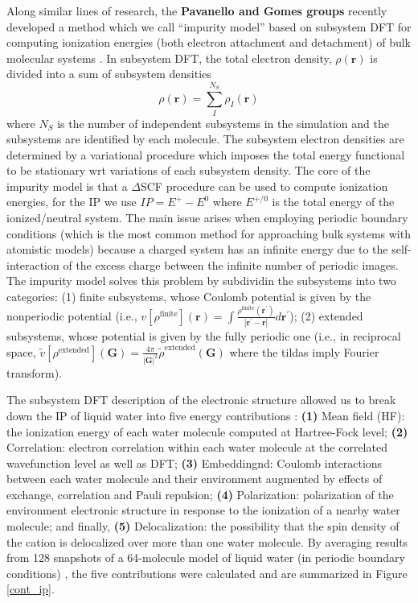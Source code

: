 \documentclass[notitlepage,12pt]{report}
\def\br{{\mathbf{r}}}
\def\bG{{\mathbf{G}}}
\def\brp{{\mathbf{r}^\prime}}
\begin{document}
    Along similar lines of research, the {\bf Pavanello and Gomes groups} recently developed a method which we call ``impurity model'' based on subsystem DFT \supercite{jacob2014subsystem,wesolowski2015frozen,krishtal2015subsystem} for computing ionization energies (both electron attachment and detachment) of bulk molecular systems \supercite{tolle2019charged}. In subsystem DFT,  the total electron density, $\rho(\br)$ is divided into a sum of subsystem densities 
\begin{equation}
    \label{dens}
    \rho(\br) = \sum_I^{N_S}\rho_I(\br)
\end{equation}
    where $N_S$ is the number of independent subsystems in the simulation and the subsystems are identified by each molecule. The subsystem electron densities are determined by a variational procedure which imposes the total energy functional to be stationary wrt variations of each subsystem density. The core of the impurity model is that a $\Delta$SCF procedure\supercite{bagus1965self,waskom2017mwaskom} can be used to compute ionization energies, for the IP we use $IP=E^+-E^0$ where $E^{+/0}$ is the total energy of the ionized/neutral system. The main issue arises when employing periodic boundary conditions (which is the most common method for approaching bulk systems with atomistic models) because a charged system has an infinite energy due to the self-interaction of the excess charge between the infinite number of periodic images. The impurity model solves this problem by subdividin the subsystems into two categories: (1) finite subsystems, whose Coulomb potential is given by the nonperiodic potential (i.e., $v[\rho^{\text{finite}}](\br)=\int\frac{\rho^{\text{finite}}(\brp)}{|\brp-\br|}d\brp$); (2) extended subsystems, whose potential is given by the fully periodic one (i.e., in reciprocal space, $\tilde v[\rho^{\text{extended}}](\bG)=\frac{4\pi}{|\bG|^2}\tilde\rho^\text{extended}(\bG)$ where the tildas imply Fourier transform).

    The subsystem DFT description of the electronic structure allowed us to break down the IP of liquid water  into five energy contributions \supercite{martinez2022ionization}:  {\bf (1)} Mean field (HF): the ionization energy of each water molecule computed at Hartree-Fock level; {\bf (2)} Correlation: electron correlation within each water molecule at the correlated wavefunction level as well as DFT; {\bf (3)} Embeddingnd: Coulomb interactions between each water molecule and their environment augmented by effects of exchange, correlation and Pauli repulsion; {\bf (4)} Polarization: polarization of the environment electronic structure in response to the ionization of a nearby water molecule; and finally, {\bf (5)} Delocalization: the possibility that the spin density of the cation is delocalized over more than one water molecule. By averaging results from  128  snapshots of a 64-molecule model of liquid water (in periodic boundary conditions) \supercite{gaiduk2018electron}, the five contributions were calculated and are summarized in Figure \ref{cont_ip}. 
\end{document}
